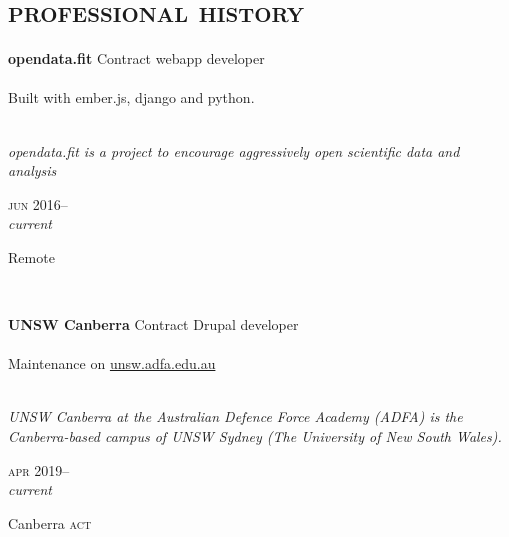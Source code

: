 
\vspace{-0.6cm}
\section*{\textsc{professional history}}
\vspace{-0.2cm}


\begin{minipage}[t]{0.75\textwidth}
\textbf{opendata.fit}\phantom{..} Contract webapp developer\\
\\
Built with ember.js, django and python.\\
\\
{\small
\textit{opendata.fit is a project to encourage aggressively open scientific data and
analysis} 
\par}
\end{minipage}
\begin{minipage}[t]{0.25\textwidth}
{
\hfill \textsc{jun} 2016--\\ 
\hspace*{0pt} \hfill \textit{current}
\par
{\small\hfill Remote}
}
\end{minipage}
\\

\begin{minipage}[t]{0.75\textwidth}
\textbf{UNSW Canberra}\phantom{..} Contract Drupal developer\\
\\
Maintenance on \href{https://unsw.adfa.edu.au/}{unsw.adfa.edu.au} \\
\\
{\small
\textit{UNSW Canberra at the Australian Defence Force Academy (ADFA) is the Canberra-based campus of UNSW Sydney (The University of New South Wales).} 
\par}
\end{minipage}
\begin{minipage}[t]{0.25\textwidth}
{
\hfill \textsc{apr} 2019--\\ 
\hspace*{0pt} \hfill \textit{current}
\par
{\small\hfill Canberra \textsc{act}}
}
\end{minipage}
\\

